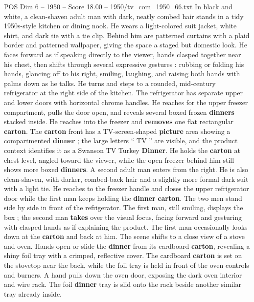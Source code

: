 \begin{textsample}{POS Dim 6 – 1950 – Score 18.00 – 1950/tv\_com\_1950\_66.txt}  \label{ex:f6_pos_002}
In black and white, a clean-shaven adult man with dark, neatly combed hair stands in a tidy 1950s-style kitchen or dining nook.
He wears a light-colored suit jacket, white shirt, and dark tie with a tie clip.
Behind him are patterned curtains with a plaid border and patterned wallpaper, giving the space a staged but domestic look.
He faces forward as if speaking directly to the viewer, hands clasped together near his chest, then shifts through several expressive gestures : rubbing or folding his hands, glancing off to his right, smiling, laughing, and raising both hands with palms down as he talks.
He turns and steps to a rounded, mid-century refrigerator at the right side of the kitchen.
The refrigerator has separate upper and lower doors with horizontal chrome handles.
He reaches for the upper freezer compartment, pulls the door open, and reveals several boxed frozen \textbf{dinners} stacked inside.
He reaches into the freezer and \textbf{removes} one flat rectangular \textbf{carton}.
The \textbf{carton} front has a TV-screen-shaped \textbf{picture} area showing a compartmented \textbf{dinner} ; the large letters “ TV ” are visible, and the product context identifies it as a Swanson TV Turkey \textbf{Dinner}.
He holds the \textbf{carton} at chest level, angled toward the viewer, while the open freezer behind him still shows more boxed \textbf{dinners}.
A second adult man enters from the right.
He is also clean-shaven, with darker, combed-back hair and a slightly more formal dark suit with a light tie.
He reaches to the freezer handle and closes the upper refrigerator door while the first man keeps holding the \textbf{dinner} \textbf{carton}.
The two men stand side by side in front of the refrigerator.
The first man, still smiling, displays the box ; the second man \textbf{takes} over the visual focus, facing forward and gesturing with clasped hands as if explaining the product.
The first man occasionally looks down at the \textbf{carton} and back at him.
The scene shifts to a close view of a stove and oven.
Hands open or slide the \textbf{dinner} from its cardboard \textbf{carton}, revealing a shiny foil tray with a crimped, reflective cover.
The cardboard \textbf{carton} is set on the stovetop near the back, while the foil tray is held in front of the oven controls and burners.
A hand pulls down the oven door, exposing the dark oven interior and wire rack.
The foil \textbf{dinner} tray is slid onto the rack beside another similar tray already inside.

\end{textsample}
